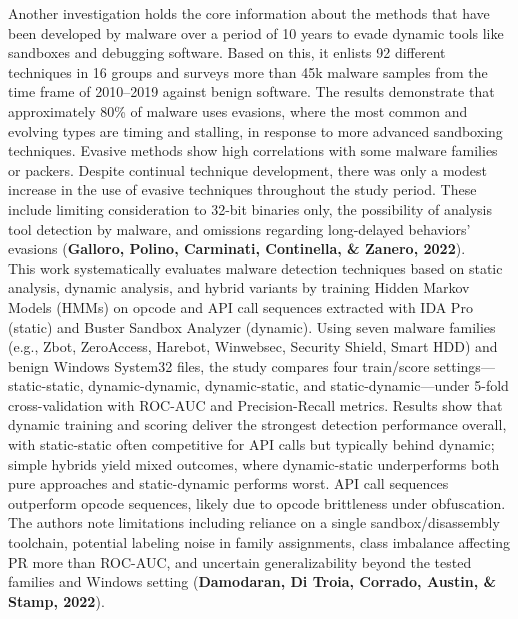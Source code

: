 Another investigation holds the core information about the methods that have been developed by malware over a period of 10 years to evade dynamic tools like sandboxes and debugging software. Based on this, it enlists 92 different techniques in 16 groups and surveys more than 45k malware samples from the time frame of 2010–2019 against benign software. The results demonstrate that approximately 80\% of malware uses evasions, where the most common and evolving types are timing and stalling, in response to more advanced sandboxing techniques. Evasive methods show high correlations with some malware families or packers. Despite continual technique development, there was only a modest increase in the use of evasive techniques throughout the study period. These include limiting consideration to 32-bit binaries only, the possibility of analysis tool detection by malware, and omissions regarding long-delayed behaviors’ evasions (\textbf{Galloro, Polino, Carminati, Continella, \& Zanero, 2022})\cite{Galloro}.\\

This work systematically evaluates malware detection techniques based on static analysis, dynamic analysis, and hybrid variants by training Hidden Markov Models (HMMs) on opcode and API call sequences extracted with IDA Pro (static) and Buster Sandbox Analyzer (dynamic). Using seven malware families (e.g., Zbot, ZeroAccess, Harebot, Winwebsec, Security Shield, Smart HDD) and benign Windows System32 files, the study compares four train/score settings—static-static, dynamic-dynamic, dynamic-static, and static-dynamic—under 5-fold cross-validation with ROC-AUC and Precision-Recall metrics. Results show that dynamic training and scoring deliver the strongest detection performance overall, with static-static often competitive for API calls but typically behind dynamic; simple hybrids yield mixed outcomes, where dynamic-static underperforms both pure approaches and static-dynamic performs worst. API call sequences outperform opcode sequences, likely due to opcode brittleness under obfuscation. The authors note limitations including reliance on a single sandbox/disassembly toolchain, potential labeling noise in family assignments, class imbalance affecting PR more than ROC-AUC, and uncertain generalizability beyond the tested families and Windows setting (\textbf{Damodaran, Di Troia, Corrado, Austin, \& Stamp, 2022})\cite{Damodaran}.\\

